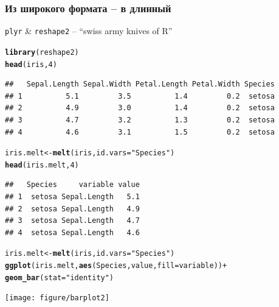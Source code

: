 \documentclass[compress]{beamer}\usepackage[]{graphicx}\usepackage[]{color}
\makeatletter
\newcommand{\hlnum}[1]{\textcolor[rgb]{0.686,0.059,0.569}{#1}}%
\newcommand{\hlstr}[1]{\textcolor[rgb]{0.192,0.494,0.8}{#1}}%
\newcommand{\hlopt}[1]{\textcolor[rgb]{0,0,0}{#1}}%
\newcommand{\hlstd}[1]{\textcolor[rgb]{0.345,0.345,0.345}{#1}}%
\newcommand{\hlkwb}[1]{\textcolor[rgb]{0.69,0.353,0.396}{#1}}%
\newcommand{\hlkwc}[1]{\textcolor[rgb]{0.333,0.667,0.333}{#1}}%
\newcommand{\hlkwd}[1]{\textcolor[rgb]{0.737,0.353,0.396}{\textbf{#1}}}%
\newenvironment{kframe}{%
 \def\at@end@of@kframe{}%
 \ifinner\ifhmode%
  \def\at@end@of@kframe{\end{minipage}}%
  \begin{minipage}{\columnwidth}%
 \fi\fi%
 \def\FrameCommand##1{\hskip\@totalleftmargin \hskip-\fboxsep
 \colorbox{shadecolor}{##1}\hskip-\fboxsep
     \hskip-\linewidth \hskip-\@totalleftmargin \hskip\columnwidth}%
 \MakeFramed {\advance\hsize-\width
   \@totalleftmargin\z@ \linewidth\hsize
   \@setminipage}}%
 {\par\unskip\endMakeFramed%
 \at@end@of@kframe}
\newenvironment{knitrout}{}{} %
\makeatother
\begin{document}
\begin{frame}[fragile]
\frametitle{Из широкого формата -- в длинный}
\texttt{plyr} \& \texttt{reshape2} -- ``swiss army knives of R''
\begin{knitrout}\footnotesize
{}\color{fgcolor}\begin{kframe}
\begin{alltt}
\hlkwd{library}\hlstd{(reshape2)}
\hlkwd{head}\hlstd{(iris,} \hlnum{4}\hlstd{)}
\end{alltt}
\begin{verbatim}
##   Sepal.Length Sepal.Width Petal.Length Petal.Width Species
## 1          5.1         3.5          1.4         0.2  setosa
## 2          4.9         3.0          1.4         0.2  setosa
## 3          4.7         3.2          1.3         0.2  setosa
## 4          4.6         3.1          1.5         0.2  setosa
\end{verbatim}
\begin{alltt}
\hlstd{iris.melt}  \hlkwb{<-} \hlkwd{melt}\hlstd{(iris,} \hlkwc{id.vars} \hlstd{=} \hlstr{"Species"}\hlstd{)}
\hlkwd{head}\hlstd{(iris.melt,} \hlnum{4}\hlstd{)}
\end{alltt}
\begin{verbatim}
##   Species     variable value
## 1  setosa Sepal.Length   5.1
## 2  setosa Sepal.Length   4.9
## 3  setosa Sepal.Length   4.7
## 4  setosa Sepal.Length   4.6
\end{verbatim}
\end{kframe}
\end{knitrout}

\end{frame}

\begin{frame}[fragile]
\begin{knitrout}\footnotesize
{}\color{fgcolor}\begin{kframe}
\begin{alltt}
\hlstd{iris.melt}  \hlkwb{<-} \hlkwd{melt}\hlstd{(iris,} \hlkwc{id.vars} \hlstd{=} \hlstr{"Species"}\hlstd{)}
\hlkwd{ggplot}\hlstd{(iris.melt,} \hlkwd{aes}\hlstd{(Species, value,} \hlkwc{fill} \hlstd{= variable))} \hlopt{+}
  \hlkwd{geom_bar}\hlstd{(}\hlkwc{stat} \hlstd{=} \hlstr{"identity"}\hlstd{)}
\end{alltt}
\end{kframe}
\texttt{[image: figure/barplot2]} 

\end{knitrout}

\end{frame}
\end{document}
